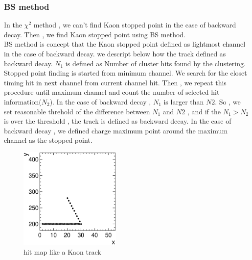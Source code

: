 \subsubsection{BS method}
In the $\chi^{2}$ method , we can't find Kaon stopped point in the case of backward decay.
Then , we find Kaon stopped point using BS method.\\ 
BS method is concept that the Kaon stopped point defined as lightmost channel in the case of backward decay.
we descript below how the track defined as backward decay.
$N_{1}$ is defined as Number of cluster hits found by the clustering.
Stopped point finding is started from minimum channel.
We search for the closet timing hit in next channel from current channel hit. 
Then , we repeat this procedure until maximum channel and count the number of selected hit information($N_{2}$).
In the case of backward decay , $N_{1}$ is larger than $N{2}$.
So , we set reasonable threhold of the difference between $N_{1}$ and $N{2}$ , and if the $N_{1}>N_{2}$ is over the threshold , the track is defined as backward decay.
In the case of backward decay , we defined charge maximum point around the maximum channel as the stopped point. 

\begin{figure}[!htb]
  \begin{center}
    \includegraphics[width=50mm]{fig/hmap_kink_BS.eps}
  \end{center}
  \caption{hit map like a Kaon track}
  \label{hmap_BS}
\end{figure}


